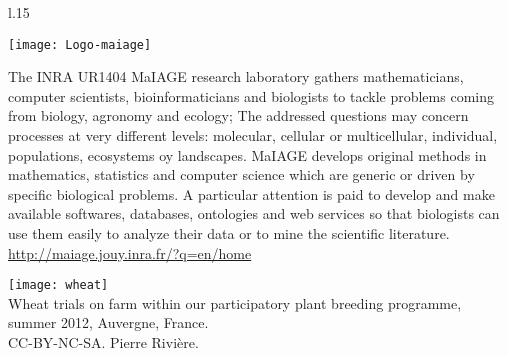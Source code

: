 \begin{wrapfigure}{l}{.15\textwidth}
\begin{center} \vspace{-20pt}
\texttt{[image: Logo-maiage]}
\end{center} \vspace{-20pt}
\end{wrapfigure}
\noindent
The INRA UR1404 MaIAGE research laboratory gathers mathematicians, computer scientists, bioinformaticians and biologists to tackle problems coming from biology, agronomy and ecology; The addressed questions may concern processes at very different levels: molecular, cellular or multicellular, individual, populations, ecosystems oy landscapes. 
MaIAGE develops original methods in mathematics, statistics and computer science which are generic or driven by specific biological problems. A particular attention is paid to develop and make available softwares, databases, ontologies and web services so that biologists can use them easily to analyze their data or to mine the scientific literature.\\
\url{http://maiage.jouy.inra.fr/?q=en/home}



\newpage

\tableofcontents

\vfill

\begin{center}
\texttt{[image: wheat]} \\
Wheat trials on farm within our participatory plant breeding programme, summer 2012, Auvergne, France. \\
CC-BY-NC-SA. Pierre Rivière.
\end{center}

\newpage
\pagestyle{plain}
